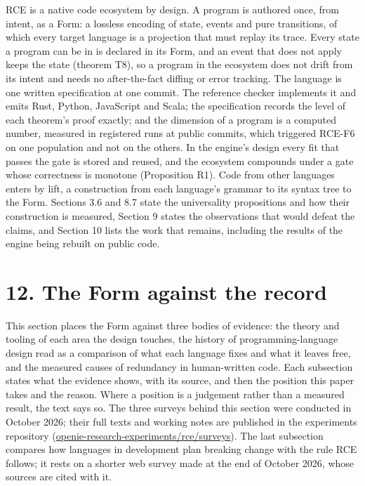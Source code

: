 \documentclass[10pt,letterpaper]{article}
\begin{document}
RCE is a native code ecosystem by design. A program is authored once,
from intent, as a Form: a lossless encoding of state, events and pure
transitions, of which every target language is a projection that must
replay its trace. Every state a program can be in is declared in its
Form, and an event that does not apply keeps the state (theorem T8), so
a program in the ecosystem does not drift from its intent and needs no
after-the-fact diffing or error tracking. The language is one written
specification at one commit. The reference checker implements it and
emits Rust, Python, JavaScript and Scala; the specification records the
level of each theorem's proof exactly; and the dimension of a program is
a computed number, measured in registered runs at public commits, which
triggered RCE-F6 on one population and not on the others. In the
engine's design every fit that passes the gate is stored and reused, and
the ecosystem compounds under a gate whose correctness is monotone
(Proposition R1). Code from other languages enters by lift, a
construction from each language's grammar to its syntax tree to the
Form. Sections 3.6 and 8.7 state the universality propositions and how
their construction is measured, Section 9 states the observations that
would defeat the claims, and Section 10 lists the work that remains,
including the results of the engine being rebuilt on public code.

\section{12. The Form against the
record}\label{the-form-against-the-record}

This section places the Form against three bodies of evidence: the
theory and tooling of each area the design touches, the history of
programming-language design read as a comparison of what each language
fixes and what it leaves free, and the measured causes of redundancy in
human-written code. Each subsection states what the evidence shows, with
its source, and then the position this paper takes and the reason. Where
a position is a judgement rather than a measured result, the text says
so. The three surveys behind this section were conducted in October
2026; their full texts and working notes are published in the
experiments repository
(\href{https://github.com/openIE-dev/openie-research-experiments/tree/main/rce/surveys}{openie-research-experiments/rce/surveys}).
The last subsection compares how languages in development plan breaking
change with the rule RCE follows; it rests on a shorter web survey made
at the end of October 2026, whose sources are cited with it.
\end{document}
